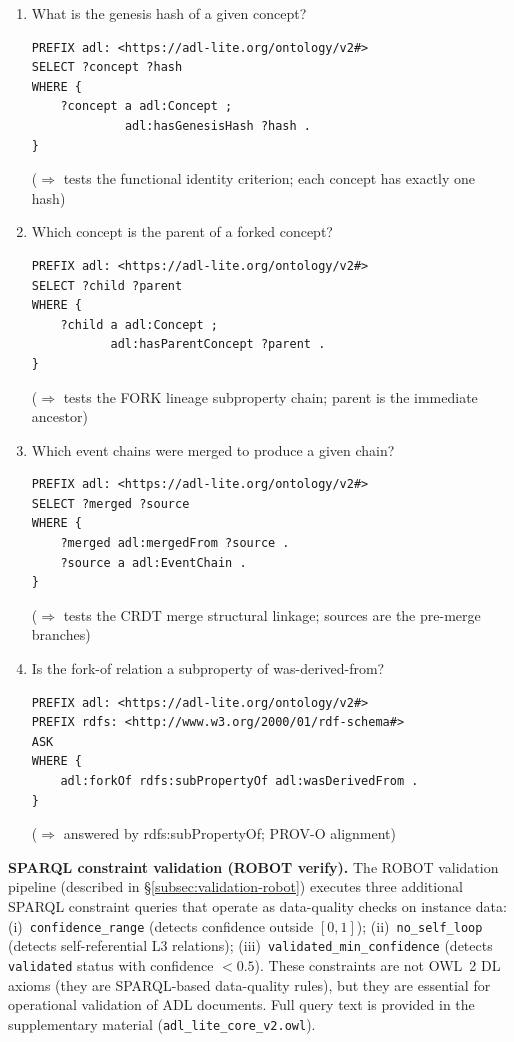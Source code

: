 \begin{enumerate}[label=CQ\arabic*:,leftmargin=3em]
    \item What is the genesis hash of a given concept?
    \begin{verbatim}
PREFIX adl: <https://adl-lite.org/ontology/v2#>
SELECT ?concept ?hash
WHERE {
    ?concept a adl:Concept ;
             adl:hasGenesisHash ?hash .
}
    \end{verbatim}
    ($\Rightarrow$ tests the functional identity criterion; each concept has exactly one hash)

    \item Which concept is the parent of a forked concept?
    \begin{verbatim}
PREFIX adl: <https://adl-lite.org/ontology/v2#>
SELECT ?child ?parent
WHERE {
    ?child a adl:Concept ;
           adl:hasParentConcept ?parent .
}
    \end{verbatim}
    ($\Rightarrow$ tests the FORK lineage subproperty chain; parent is the immediate ancestor)

    \item Which event chains were merged to produce a given chain?
    \begin{verbatim}
PREFIX adl: <https://adl-lite.org/ontology/v2#>
SELECT ?merged ?source
WHERE {
    ?merged adl:mergedFrom ?source .
    ?source a adl:EventChain .
}
    \end{verbatim}
    ($\Rightarrow$ tests the CRDT merge structural linkage; sources are the pre-merge branches)

    \item Is the fork-of relation a subproperty of was-derived-from?
    \begin{verbatim}
PREFIX adl: <https://adl-lite.org/ontology/v2#>
PREFIX rdfs: <http://www.w3.org/2000/01/rdf-schema#>
ASK
WHERE {
    adl:forkOf rdfs:subPropertyOf adl:wasDerivedFrom .
}
    \end{verbatim}
    ($\Rightarrow$ answered by rdfs:subPropertyOf; PROV-O alignment)

\end{enumerate}

\textbf{SPARQL constraint validation (ROBOT verify).}
The ROBOT validation pipeline (described in \S\ref{subsec:validation-robot}) executes three additional SPARQL constraint queries that operate as data-quality checks on instance data: (i)~\texttt{confidence\_range} (detects confidence outside $[0,1]$); (ii)~\texttt{no\_self\_loop} (detects self-referential L3 relations); (iii)~\texttt{validated\_min\_confidence} (detects \texttt{validated} status with confidence $< 0.5$). These constraints are not OWL~2 DL axioms (they are SPARQL-based data-quality rules), but they are essential for operational validation of ADL documents. Full query text is provided in the supplementary material (\texttt{adl\_lite\_core\_v2.owl}).


